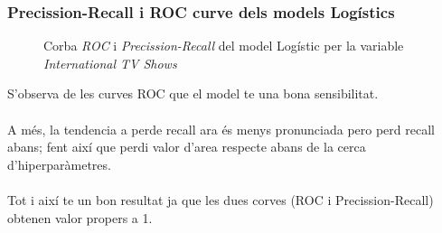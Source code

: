 \documentclass[a4paper, 11pt]{article}
\begin{document}
\subsubsection{Precission-Recall i ROC curve dels models Logístics}
\begin{figure}[h]
\centering
    \caption{Corba \textit{ROC} i \textit{Precission-Recall} del model Logístic per la variable \textit{International TV Shows}}
    \label{fig:my_label}
\end{figure}
\hspace{-1.5em}S'observa de les curves ROC que el model te una bona sensibilitat.\\\\
A més, la tendencia a perde recall ara és menys pronunciada pero perd recall abans; fent així que perdi valor d'area respecte abans de la cerca d'hiperparàmetres.\\\\
Tot i així te un bon resultat ja que les dues corves (ROC i Precission-Recall) obtenen valor propers a 1.\\
\end{document}
